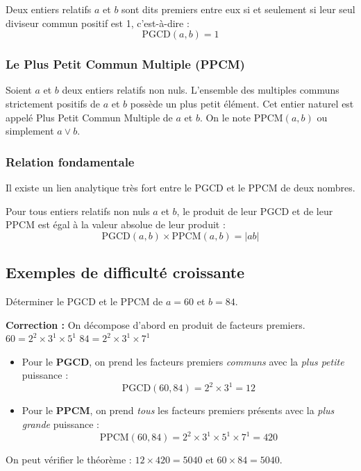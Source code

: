 \begin{definition}
Deux entiers relatifs $a$ et $b$ sont dits premiers entre eux si et seulement si leur seul diviseur commun positif est 1, c'est-à-dire :
$$\text{PGCD}(a, b) = 1$$
\end{definition}

\subsubsection{Le Plus Petit Commun Multiple (PPCM)}

\begin{definition}[PPCM]
Soient $a$ et $b$ deux entiers relatifs non nuls. L'ensemble des multiples communs strictement positifs de $a$ et $b$ possède un plus petit élément. Cet entier naturel est appelé Plus Petit Commun Multiple de $a$ et $b$.
On le note $\text{PPCM}(a, b)$ ou simplement $a \vee b$.
\end{definition}

\subsubsection{Relation fondamentale}

Il existe un lien analytique très fort entre le PGCD et le PPCM de deux nombres.

\begin{theoreme}
Pour tous entiers relatifs non nuls $a$ et $b$, le produit de leur PGCD et de leur PPCM est égal à la valeur absolue de leur produit :
$$\text{PGCD}(a, b) \times \text{PPCM}(a, b) = |ab|$$
\end{theoreme}

\subsection{Exemples de difficulté croissante}

\begin{exemple}
Déterminer le PGCD et le PPCM de $a = 60$ et $b = 84$.
\end{exemple}

\textbf{Correction :} On décompose d'abord en produit de facteurs premiers.
$60 = 2^2 \times 3^1 \times 5^1$
$84 = 2^2 \times 3^1 \times 7^1$

\begin{itemize}
    \item Pour le \textbf{PGCD}, on prend les facteurs premiers \textit{communs} avec la \textit{plus petite} puissance :
    $$\text{PGCD}(60, 84) = 2^2 \times 3^1 = 12$$
    \item Pour le \textbf{PPCM}, on prend \textit{tous} les facteurs premiers présents avec la \textit{plus grande} puissance :
    $$\text{PPCM}(60, 84) = 2^2 \times 3^1 \times 5^1 \times 7^1 = 420$$
\end{itemize}
On peut vérifier le théorème : $12 \times 420 = 5040$ et $60 \times 84 = 5040$.


